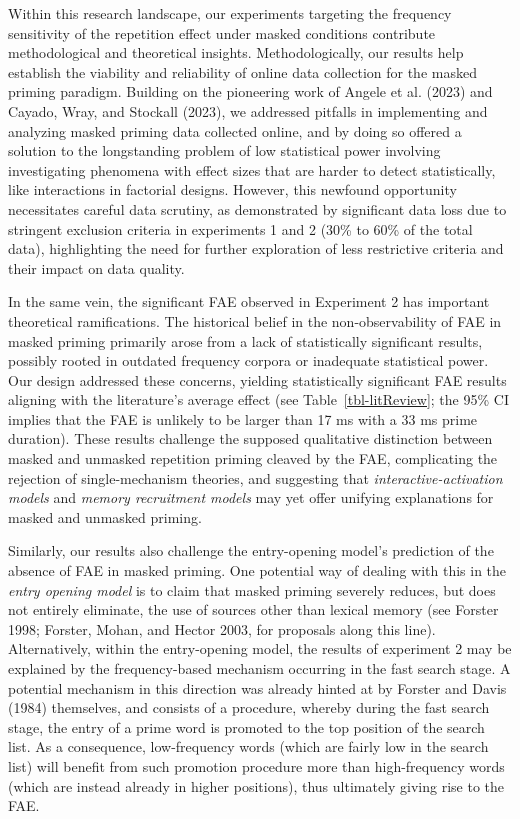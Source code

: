 \documentclass[
]{interact}
\begin{document}
Within this research landscape, our experiments targeting the frequency
sensitivity of the repetition effect under masked conditions contribute
methodological and theoretical insights. Methodologically, our results
help establish the viability and reliability of online data collection
for the masked priming paradigm. Building on the pioneering work of
Angele et al. (2023) and Cayado, Wray, and Stockall (2023), we addressed
pitfalls in implementing and analyzing masked priming data collected
online, and by doing so offered a solution to the longstanding problem
of low statistical power involving investigating phenomena with effect
sizes that are harder to detect statistically, like interactions in
factorial designs. However, this newfound opportunity necessitates
careful data scrutiny, as demonstrated by significant data loss due to
stringent exclusion criteria in experiments 1 and 2 (30\% to 60\% of the
total data), highlighting the need for further exploration of less
restrictive criteria and their impact on data quality.

In the same vein, the significant FAE observed in Experiment 2 has
important theoretical ramifications. The historical belief in the
non-observability of FAE in masked priming primarily arose from a lack
of statistically significant results, possibly rooted in outdated
frequency corpora or inadequate statistical power. Our design addressed
these concerns, yielding statistically significant FAE results aligning
with the literature's average effect (see Table~\ref{tbl-litReview}; the
95\% CI implies that the FAE is unlikely to be larger than 17 ms with a
33 ms prime duration). These results challenge the supposed qualitative
distinction between masked and unmasked repetition priming cleaved by
the FAE, complicating the rejection of single-mechanism theories, and
suggesting that \emph{interactive-activation models} and \emph{memory
recruitment models} may yet offer unifying explanations for masked and
unmasked priming.

Similarly, our results also challenge the entry-opening model's
prediction of the absence of FAE in masked priming. One potential way of
dealing with this in the \emph{entry opening model} is to claim that
masked priming severely reduces, but does not entirely eliminate, the
use of sources other than lexical memory (see Forster 1998; Forster,
Mohan, and Hector 2003, for proposals along this line). Alternatively,
within the entry-opening model, the results of experiment 2 may be
explained by the frequency-based mechanism occurring in the fast search
stage. A potential mechanism in this direction was already hinted at by
Forster and Davis (1984) themselves, and consists of a procedure,
whereby during the fast search stage, the entry of a prime word is
promoted to the top position of the search list. As a consequence,
low-frequency words (which are fairly low in the search list) will
benefit from such promotion procedure more than high-frequency words
(which are instead already in higher positions), thus ultimately giving
rise to the FAE.
\end{document}
